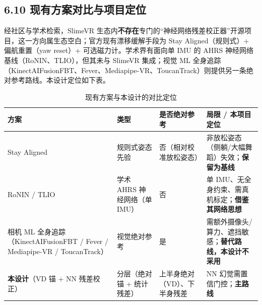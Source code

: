 \documentclass[UTF8,11pt,a4paper]{ctexart}
\begin{document}
\subsection{6.10 现有方案对比与项目定位}
经社区与学术检索，SlimeVR 生态内\textbf{不存在}专门的“神经网络残差校正器”开源项目，这一方向属生态空白；官方现有漂移缓解手段为 Stay Aligned（规则式）+ 偏航重置（yaw reset）+ 可选磁力计。学术界有面向单 IMU 的 AHRS 神经网络基线（RoNIN、TLIO），但其未与 SlimeVR 集成；视觉 ML 全身追踪（KinectAIFusionFBT、Fever、Mediapipe-VR、ToucanTrack）则提供另一条绝对参考路线。本设计定位如下表。

\begin{table}[H]
\centering
\small
\caption{现有方案与本设计的对比定位}
\label{tab:compare}
\begin{tabular}{p{3.0cm}p{2.6cm}p{2.0cm}p{4.0cm}}
\toprule
\textbf{方案} & \textbf{类型} & \textbf{是否绝对参考} & \textbf{局限 / 本项目定位} \\
\midrule
Stay Aligned & 规则式姿态先验 & 否（相对校准放松姿态） & 非放松姿态（侧躺/大幅舞蹈）失效；\textbf{保留为基线} \\
RoNIN / TLIO & 学术 AHRS 神经网络（单 IMU） & 否 & 单 IMU、无全身约束、需真机标定；\textbf{借鉴其网络思想} \\
相机 ML 全身追踪（KinectAIFusionFBT / Fever / Mediapipe-VR / ToucanTrack） & 视觉绝对参考 & 是 & 需额外摄像头/算力、遮挡敏感；\textbf{替代路线，本设计不采用} \\
\textbf{本设计}（VD 锚 + NN 残差校正） & 分层（绝对锚 + 统计残差） & 上半身绝对（VD）、下半身残差 & NN 幻觉需置信门控；\textbf{主路线} \\
\bottomrule
\end{tabular}
\end{table}
\end{document}
